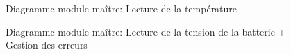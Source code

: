 		\begin{figure}[H]
			\centering
			\caption{Diagramme module maître: Lecture de la température}
			\label{fig:diagrammefonctionnelmaitrelecturetemp}
		\end{figure}
			
		\begin{figure}[H]
			\centering
			\caption{Diagramme module maître: Lecture de la tension de la batterie + Gestion des erreurs}
			\label{fig:diagrammefonctionnelmaitrelecturebat}
		\end{figure}
			

